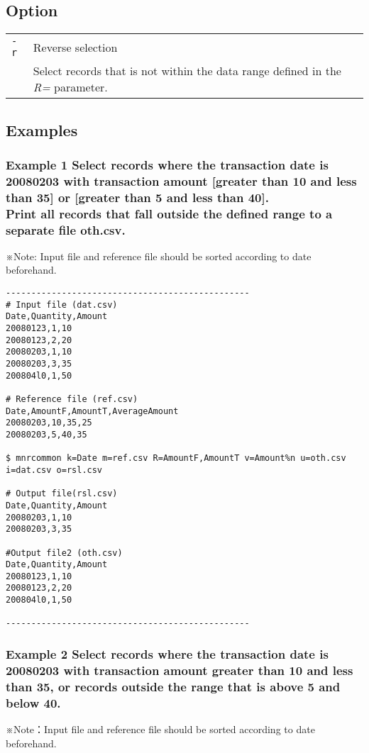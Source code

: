 \documentclass[a4paper]{jarticle}
\begin{document}
\subsection*{Option}
\begin{table}[htbp]
{\small
\begin{tabular}{ll}
\verb|-r|  & Reverse selection\\
& Select records that is not within the data range defined in the \emph{R=} parameter. \\
\end{tabular} 
}
\end{table} 

\subsection*{Examples}
\subsubsection*{Example 1 Select records where the transaction date is 20080203 with transaction amount [greater than 10 and less than 35] or [greater than 5 and less than 40].   \\Print all records that fall outside the defined range to a separate file oth.csv. }
\noindent
※Note: Input file and reference file should be sorted according to date beforehand. 

\begin{verbatim}
------------------------------------------------
# Input file (dat.csv)
Date,Quantity,Amount
20080123,1,10
20080123,2,20
20080203,1,10
20080203,3,35
200804l0,1,50

# Reference file (ref.csv)
Date,AmountF,AmountT,AverageAmount
20080203,10,35,25
20080203,5,40,35

$ mnrcommon k=Date m=ref.csv R=AmountF,AmountT v=Amount%n u=oth.csv i=dat.csv o=rsl.csv

# Output file(rsl.csv)
Date,Quantity,Amount
20080203,1,10
20080203,3,35

#Output file2 (oth.csv)
Date,Quantity,Amount
20080123,1,10
20080123,2,20
200804l0,1,50

------------------------------------------------
\end{verbatim}

\subsubsection*{Example 2 Select records where the transaction date is 20080203 with transaction amount greater than 10 and less than 35, or records outside the range that is above 5 and below 40. }
\noindent
※Note：Input file and reference file should be sorted according to date beforehand. 
\end{document}
